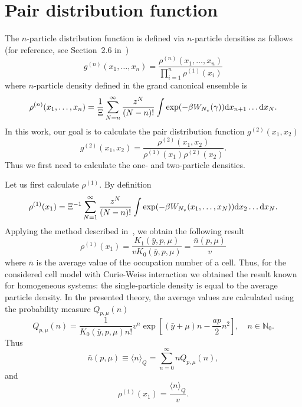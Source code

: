 \section{\label{sec:init-pair-distribution} Pair distribution function}
The $n$-particle distribution function is defined via $n$-particle densities as follows (for reference, see Section~2.6 in~\cite{hansen2013theory})
\begin{equation*}
	\label{def:g_n}
	g^{(n)}(x_1,\dotsc,x_n)=\frac{\rho^{(n)}(x_1,\dotsc,x_n)}{\prod_{i=1}^{n}\rho^{(1)}(x_i)}
\end{equation*}
where $n$-particle density defined in the grand canonical ensemble is
\begin{eqnarray*}
	\label{def:rho_n}
	\rho^{(n)}(x_1,\dotsc,x_n) = \frac{1}{\Xi}\sum_{N=n}^{\infty} \frac{z^N}{(N-n)!} \int\exp(-\beta W_{N_v}(\gamma)) {\rm d} x_{n+1} \dotsc {\rm d} x_N.
\end{eqnarray*}
In this work, our goal is to calculate the pair distribution function $g^{(2)}(x_1, x_2)$
\begin{equation*}
	g^{(2)}(x_1, x_2) = \frac{\rho^{(2)}(x_1, x_2)}{\rho^{(1)}(x_1) \rho^{(2)}(x_2)}.
\end{equation*}
Thus we first need to calculate the one- and two-particle densities.

Let us first calculate $\rho^{(1)}$. By definition
\begin{equation*}
	\rho^{(1)} (x_1) = \Xi^{-1} \sum_{N=1}^{\infty} \frac{z^N}{(N-n)!} \int \exp(-\beta W_{N_v}(x_1, \dotsc, x_N)) {\rm d} x_2 \dotsc {\rm d} x_N.
\end{equation*}
Applying the method described in~\cite{KozitskyKozlovskiiDobush2020}, we obtain the following result
\begin{equation*}
	\rho^{(1)} (x_1) = \frac{K_1(\bar{y}, p, \mu)}{v K_0(\bar{y},p,\mu)} = \frac{\bar{n}(p,\mu)}{v}
\end{equation*}
where $\bar{n}$ is the average value of the occupation number of a cell. Thus, for the considered cell model with Curie-Weiss interaction we obtained the result known for homogeneous systems: the single-particle density is equal to the average particle density. In the presented theory, the average values are calculated using the probability measure $Q_{p,\mu}(n)$
\begin{equation*}
	Q_{p,\mu}(n) = \frac{1}{K_0(\bar{y}, p, \mu) n!} v^n \exp\left[(\bar{y} + \mu)n - \frac{a p}{2}n^2 \right],
	\quad n \in \mathbb{N}_0.
\end{equation*}
Thus
\begin{equation*}
	\bar{n}(p, \mu) \equiv \langle n \rangle_{Q} = \sum_{n=0}^{\infty} n Q_{p, \mu}(n),
\end{equation*}
and 
\begin{equation}
	\rho^{(1)}(x_1) = \frac{\langle n \rangle_{Q}}{v}.
\end{equation}

